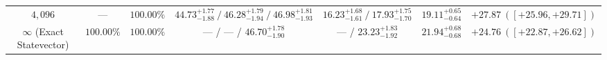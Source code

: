 \documentclass[10pt,a4paper]{article}
\begin{document}
\begin{table}[!htbp]
{\begin{tabular}{ccccccc}
$4{,}096$ & --- & $\mathbf{100.00}\%$ & $44.73^{+1.77}_{-1.88}\ /\ 46.28^{+1.79}_{-1.94}\ /\ \mathbf{46.98}^{+1.81}_{-1.93}$ & $16.23^{+1.68}_{-1.61}\ /\ 17.93^{+1.75}_{-1.70}$ & $19.11^{+0.65}_{-0.64}$ & $\mathbf{+27.87}\ ([+25.96, +29.71])$ \\
$\infty$ (Exact Statevector) & $100.00\%$ & $\mathbf{100.00}\%$ & --- / --- / $\mathbf{46.70}^{+1.78}_{-1.90}$ & --- / $23.23^{+1.83}_{-1.92}$ & $21.94^{+0.68}_{-0.68}$ & $\mathbf{+24.76}\ ([+22.87, +26.62])$ \\
\bottomrule
\end{tabular}%
}
\end{table}
\end{document}

